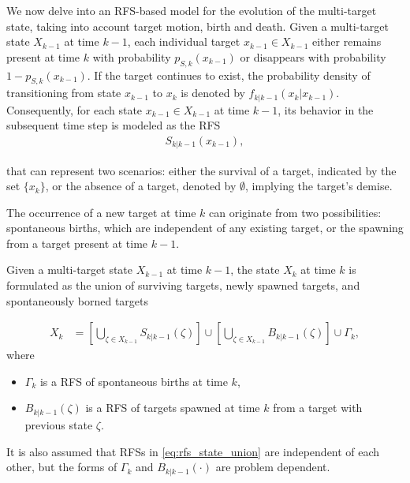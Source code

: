 We now delve into an RFS-based model for the evolution of the multi-target state, taking into account target motion,
birth and death. Given a multi-target state $X_{k-1}$ at time $k-1$, each individual target $x_{k-1} \in X_{k-1}$
either remains present at time $k$ with probability $p_{S,k}(x_{k-1})$ or disappears with probability $1 - p_{S,k}(x_{k-1})$. If the target continues to exist, the probability density of transitioning from state $x_{k-1}$ to $x_k$ is denoted by $f_{k|k-1}(x_k|x_{k-1})$. Consequently, for each state $x_{k-1} \in X_{k-1}$ at time $k-1$, its behavior in the subsequent time step is modeled as the RFS
\begin{align}
    S_{k|k-1}(x_{k-1}),
\end{align}

that can represent two scenarios: either the survival of a target, indicated by the set $\{x_k\}$, or the absence of a
target, denoted by $\emptyset$, implying the target's demise.

The occurrence of a new target at time $k$ can originate from two possibilities: spontaneous births, which are independent of any existing target, or the spawning from a target present at time $k-1$.

Given a multi-target state $X_{k-1}$ at time $k-1$, the state $X_k$ at time $k$ is formulated as the union of
surviving targets, newly spawned targets, and spontaneously borned targets

\begin{align}
    X_k &= \left[\bigcup_{\zeta \in X_{k-1}}S_{k|k-1}(\zeta) \right] \cup \left[ \bigcup_{\zeta \in X_{k-1}} B_{k|k-1}(\zeta) \right] \cup \Gamma_k, \label{eq:rfs_state_union}
\end{align}
where
\begin{itemize}
    \item $\Gamma_k$ is a RFS of spontaneous births at time $k$,
    \item $B_{k|k-1}(\zeta)$ is a RFS of targets spawned at time $k$ from a target with previous state $\zeta$.
\end{itemize}
It is also assumed that RFSs in \eqref{eq:rfs_state_union} are independent of each other, but the forms of $\Gamma_k$
and $B_{k|k-1}(\cdot)$ are problem dependent.

